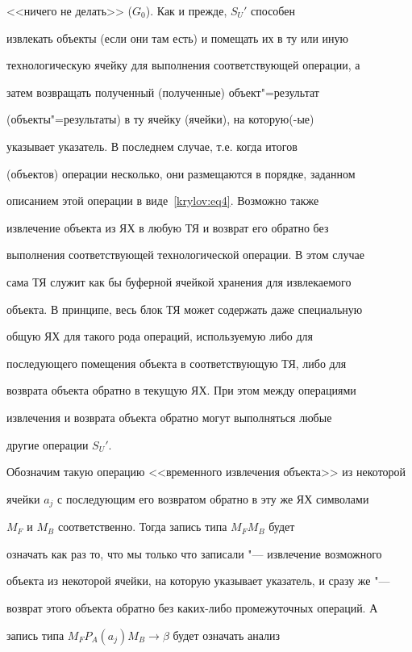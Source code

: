 <<ничего не делать>> ($G_{0}$). Как и прежде, $S_{U}'$ способен

извлекать объекты (если они там есть) и помещать их в ту или иную

технологическую ячейку для выполнения соответствующей операции, а

затем возвращать полученный (полученные) объект"=результат

(объекты"=результаты) в ту ячейку (ячейки), на которую(-ые)

указывает указатель. В последнем случае, т.е. когда итогов

(объектов) операции несколько, они размещаются в порядке, заданном

описанием этой операции в виде~\eqref{krylov:eq4}. Возможно также

извлечение объекта из ЯХ в любую ТЯ и возврат его обратно без

выполнения соответствующей технологической операции. В этом случае

сама ТЯ служит как бы буферной ячейкой хранения для извлекаемого

объекта. В принципе, весь блок ТЯ может содержать даже специальную

общую ЯХ для такого рода операций, используемую либо для

последующего помещения объекта в соответствующую ТЯ, либо для

возврата объекта обратно в текущую ЯХ. При этом между операциями

извлечения и возврата объекта обратно могут выполняться любые

другие операции $S_{U}'$.









Обозначим такую операцию <<временного извлечения объекта>> из некоторой

ячейки $a_{j}$ с последующим его возвратом обратно в эту же ЯХ символами

$M_{F}$ и $M_{B}$ соответственно. Тогда запись типа $M_{F}M_{B}$ будет

означать как раз то, что мы только что записали "--- извлечение возможного

объекта из некоторой ячейки, на которую указывает указатель, и сразу же "---

возврат этого объекта обратно без каких-либо промежуточных операций. А

запись типа $M_{F}P_{A}(a_{j})M_{B}\to \beta $ будет означать анализ

